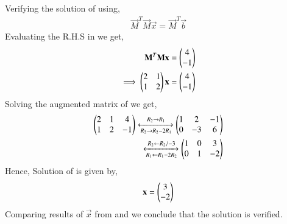 \documentclass[journal,12pt,twocolumn]{IEEEtran}
\begin{document}
Verifying the solution of  using,
\begin{align}
\vec{M}^T\vec{M}\vec{x} = \vec{M}^T\vec{b}\label{eqVerify}
\end{align}
Evaluating the R.H.S in  we get,
\begin{align}
\mathbf{M}^T\mathbf{M}\mathbf{x} &= \begin{pmatrix}4\\-1\end{pmatrix}\\
\implies\begin{pmatrix}2&1\\1&2\end{pmatrix}\mathbf{x} &= \begin{pmatrix}4\\-1\end{pmatrix}\label{eqMateq}
\end{align}
Solving the augmented matrix of  we get,
\begin{align}
\begin{pmatrix}2&1&4\\1&2&-1\end{pmatrix}\xleftrightarrow[R_2\rightarrow{R_2-2R_1}]{R_2\rightarrow{R_1}}\begin{pmatrix}1&2&-1\\0&-3&6\end{pmatrix}\\\xleftrightarrow[R_1\leftarrow{R_1-2R_2}]{R_2\leftarrow{R_2/-3}}\begin{pmatrix}1&0&3\\0&1&-2\end{pmatrix}
\end{align}
Hence, Solution of  is given by,
\begin{align}
\mathbf{x}=\begin{pmatrix}3\\-2\end{pmatrix}\label{eqX2}
\end{align}
Comparing results of $\vec{x}$ from  and  we conclude that the solution is verified.
 
\end{document}
